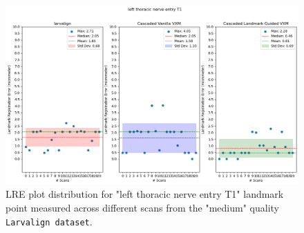 	\begin{figure}[h!]
		\centering
		\includegraphics[width=0.75\columnwidth]{resources/chapter5_fresh/output/left thoracic nerve entry T1.png}
		\caption{LRE plot distribution for "left thoracic nerve entry T1" landmark point measured across different scans from the "medium" quality \texttt{Larvalign dataset}.}
		\label{fig:landmark30}
	\end{figure}


